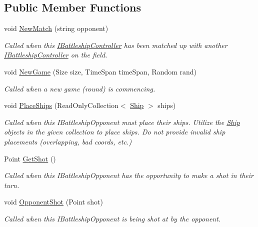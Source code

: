 \subsection*{Public Member Functions}
\begin{DoxyCompactItemize}
\item 
void \hyperlink{interface_m_b_c_1_1_core_1_1_i_battleship_controller_a44c7a001b2005e411ccb894223efa3d9}{New\-Match} (string opponent)
\begin{DoxyCompactList}\small\item\em Called when this \hyperlink{interface_m_b_c_1_1_core_1_1_i_battleship_controller}{I\-Battleship\-Controller} has been matched up with another \hyperlink{interface_m_b_c_1_1_core_1_1_i_battleship_controller}{I\-Battleship\-Controller} on the field.\end{DoxyCompactList}\item 
void \hyperlink{interface_m_b_c_1_1_core_1_1_i_battleship_controller_a17dafb26838363ab7630278962523828}{New\-Game} (Size size, Time\-Span time\-Span, Random rand)
\begin{DoxyCompactList}\small\item\em Called when a new game (round) is commencing.\end{DoxyCompactList}\item 
void \hyperlink{interface_m_b_c_1_1_core_1_1_i_battleship_controller_aacd76e5a0143ed65b3cd4f911b658866}{Place\-Ships} (Read\-Only\-Collection$<$ \hyperlink{class_m_b_c_1_1_core_1_1_ship}{Ship} $>$ ships)
\begin{DoxyCompactList}\small\item\em Called when this I\-Battleship\-Opponent must place their ships. Utilize the \hyperlink{class_m_b_c_1_1_core_1_1_ship}{Ship} objects in the given collection to place ships. Do not provide invalid ship placements (overlapping, bad coords, etc.)\end{DoxyCompactList}\item 
Point \hyperlink{interface_m_b_c_1_1_core_1_1_i_battleship_controller_a1e3990b3561cdc6980332b60359d797a}{Get\-Shot} ()
\begin{DoxyCompactList}\small\item\em Called when this I\-Battleship\-Opponent has the opportunity to make a shot in their turn.\end{DoxyCompactList}\item 
void \hyperlink{interface_m_b_c_1_1_core_1_1_i_battleship_controller_ae8805f1f06e67901db8be2665076582f}{Opponent\-Shot} (Point shot)
\begin{DoxyCompactList}\small\item\em Called when this I\-Battleship\-Opponent is being shot at by the opponent.\end{DoxyCompactList}\item 

\end{DoxyCompactItemize}

